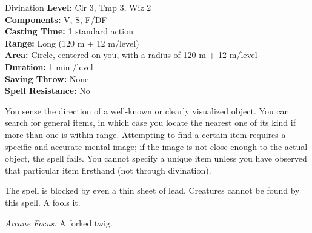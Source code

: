{Divination}
{
	\textbf{Level:}
	Clr 3, Tmp 3, Wiz 2\\
	\textbf{Components:}
	V, S, F/DF\\
	\textbf{Casting Time:}
	1 standard action\\
	\textbf{Range:}
	Long (120 m + 12 m/level)\\
	\textbf{Area:}
	Circle, centered on you, with a radius of 120 m + 12 m/level\\
	\textbf{Duration:}
	1 min./level\\
	\textbf{Saving Throw:}
	None\\
	\textbf{Spell Resistance:}
	No\\
}
{
	You sense the direction of a well-known or clearly visualized object. You can search for general items, in which case you locate the nearest one of its kind if more than one is within range. Attempting to find a certain item requires a specific and accurate mental image; if the image is not close enough to the actual object, the spell fails. You cannot specify a unique item unless you have observed that particular item firsthand (not through divination).

	The spell is blocked by even a thin sheet of lead. Creatures cannot be found by this spell. A  fools it.

	\textit{Arcane Focus:}
	A forked twig.

}
